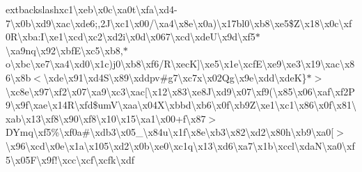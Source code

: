 \begin{DoxyCompactItemize}
extbackslash{}xc1\textbackslash{}xeb\textbackslash{}x0c\textbackslash{}xa0t\textbackslash{}xfa\textbackslash{}xd4-\/7\textbackslash{}x0b\textbackslash{}xd9\textbackslash{}xac\textbackslash{}xde6;,2\+J\textbackslash{}xc1\textbackslash{}x00/\textbackslash{}xa4\textbackslash{}x8e\textbackslash{}x0a)\textbackslash{}x17bl0\textbackslash{}xb8\textbackslash{}xe5\$\+Z\textbackslash{}x18\textbackslash{}x0c\textbackslash{}xf0\+R\textbackslash{}xba\+:\+I\textbackslash{}xe1\textbackslash{}xcd\textbackslash{}xc2\textbackslash{}xd2i\textbackslash{}x0d\textbackslash{}x067\textbackslash{}xcd\textbackslash{}xde\+U\textbackslash{}x9d\textbackslash{}xf5$\ast$\textbackslash{}xa9nq\textbackslash{}x92\textbackslash{}xbf\+E\textbackslash{}xc5\textbackslash{}xb8,$\ast$o\textbackslash{}xbc\textbackslash{}xe7\textbackslash{}xa4\textbackslash{}xd0\textbackslash{}x1c)j0\textbackslash{}xb8\textbackslash{}xf6/\+R\textbackslash{}xec\+K\mbox{]}\textbackslash{}xe5\textbackslash{}x1e\textbackslash{}xcf\+E\textbackslash{}xe9\textbackslash{}xe3\textbackslash{}x19\textbackslash{}xac\textbackslash{}x86\textbackslash{}x8b$<$\textbackslash{}xde\textbackslash{}x91\textbackslash{}xd4\+S\textbackslash{}x89\textbackslash{}xddpv\#g7\textquotesingle{}\textbackslash{}xc7x\textbackslash{}x02\+Qg\textbackslash{}x9e\textbackslash{}xdd\textbackslash{}xde\+K\}$\ast$$>$\textbackslash{}xc8e\textbackslash{}x97\textbackslash{}xf2\textbackslash{}x07\textbackslash{}xa9\textbackslash{}xc3\textbackslash{}xac\mbox{[}\textbackslash{}x12\textbackslash{}x83\textbackslash{}xe8\+J\textbackslash{}xd9\textbackslash{}x07\textbackslash{}xf9(\textbackslash{}x85\textbackslash{}x06\textbackslash{}xaf\textbackslash{}xf2\+P9\textbackslash{}x9f\textbackslash{}xae\textbackslash{}x14\+R\textbackslash{}xfd\$um\+V\textbackslash{}xaa\textbackslash{}x04\+X\textbackslash{}xbbd\textbackslash{}xb6\textbackslash{}x0f\textbackslash{}xb9\+Z\textbackslash{}xe1\textbackslash{}xc1\textbackslash{}x86\textbackslash{}x0f\textbackslash{}x81\textbackslash{}xab\textbackslash{}x13\textbackslash{}xf8\textbackslash{}x90\textbackslash{}xf8\textbackslash{}x10\textbackslash{}x15\textbackslash{}xa1\textbackslash{}x00+f\textbackslash{}x87$>$\+D\+Ymq\textbackslash{}xf5\%\textbackslash{}xf0a\#\textbackslash{}xdb3\textbackslash{}x05\+\_\+\textbackslash{}x84u\textbackslash{}x1f\textbackslash{}x8e\textbackslash{}xb3\textbackslash{}x82\textbackslash{}xd2\textbackslash{}x80h\textbackslash{}xb9\textbackslash{}xa0\mbox{[}$>$\textbackslash{}x96\textbackslash{}xcd\textbackslash{}x0e\textbackslash{}x1a\textbackslash{}x105\textbackslash{}xd2\textbackslash{}x0b\textbackslash{}xe0\textbackslash{}xc1q\textbackslash{}x13\textbackslash{}xd6\textbackslash{}xa7\textbackslash{}x1b\textbackslash{}xccl\textbackslash{}xda\+N\textbackslash{}xa0\textbackslash{}xf5\textbackslash{}x05\+F\textbackslash{}x9f!\textbackslash{}xcc\textbackslash{}xcf\textbackslash{}xcfk\textbackslash{}xdf 
\end{DoxyCompactItemize}
